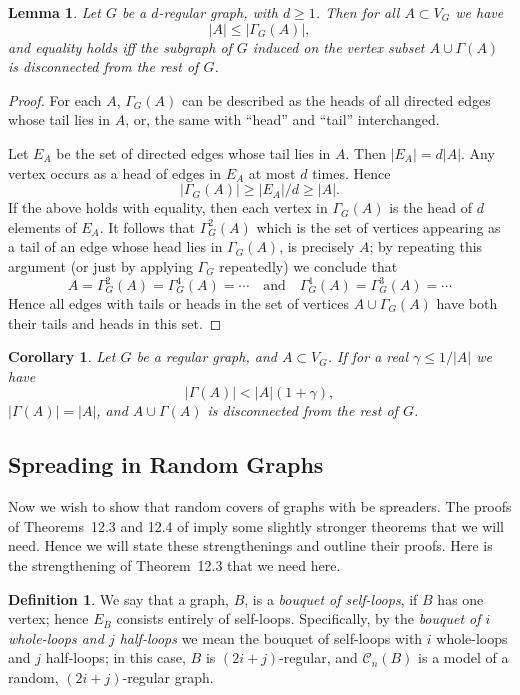 \documentclass{memo-l}
\theoremstyle{plain}
\newtheorem{lemma}[theorem]{Lemma}
\newtheorem{corollary}[theorem]{Corollary}
\theoremstyle{definition}
\newtheorem{definition}[theorem]{Definition}
\numberwithin{section}{chapter}
\numberwithin{equation}{chapter}
\theoremstyle{plain}
\theoremstyle{definition}
\newcommand\cC{\mathcal{C}}
\begin{document}
\begin{lemma}\label{le:disconnected}
Let $G$ be a $d$-regular graph, with $d\ge 1$.  
Then for all $A\subset V_G$ we have
$$
|A| \le |\Gamma_G(A)|,
$$
and equality holds iff the subgraph of $G$ induced on the
vertex subset $A\cup \Gamma(A)$ is disconnected from the rest of $G$.
\end{lemma}
\begin{proof}
For each $A$, $\Gamma_G(A)$ can be described as the heads of all directed
edges whose tail lies in $A$, or, the same with ``head'' and ``tail''
interchanged.

Let $E_A$ be the set of
directed edges whose tail lies in $A$.  Then $|E_A|=d|A|$.
Any vertex occurs as a head of edges in $E_A$ at most $d$ times.
Hence 
$$
|\Gamma_G(A)|\ge |E_A|/d \ge |A|.
$$
If the above holds with equality, then each vertex in $\Gamma_G(A)$
is the head of $d$ elements of $E_A$.  It follows that
$\Gamma^2_G(A)$ which is the set of vertices appearing as a tail
of an edge whose head lies in $\Gamma_G(A)$, is precisely $A$; by repeating
this argument (or just by applying $\Gamma_G$ repeatedly) we conclude
that
$$
A = \Gamma^2_G(A) = \Gamma^4_G(A) = \cdots
\quad\mbox{and}\quad
\Gamma^1_G(A) = \Gamma^3_G(A) = \cdots
$$
Hence all edges with tails or heads in the set of vertices
$A\cup\Gamma_G(A)$ have both their tails and heads in this set.
\end{proof}

\begin{corollary}\label{co:disconnected}
Let $G$ be a regular graph, and $A\subset V_G$.  If for 
a real $\gamma \le 1/|A|$ we have 
$$
|\Gamma(A)| < |A| (1+\gamma),
$$
$|\Gamma(A)|=|A|$, and
$A\cup \Gamma(A)$ is disconnected from the rest of $G$.
\end{corollary}



\subsection{Spreading in Random Graphs}

Now we wish to show that random covers of graphs with be spreaders.
The proofs of 
Theorems~12.3 and 12.4 of \cite{friedman_alon} imply some
slightly stronger theorems that we will need.  Hence we will
state these strengthenings and outline their proofs.
Here is the strengthening of Theorem~12.3 that we need here.

\begin{definition} 
We say that a graph, $B$, is a {\em bouquet of self-loops}, if $B$ has one
vertex; hence $E_B$ consists entirely of self-loops.
Specifically, by the {\em bouquet of $i$ whole-loops and $j$ half-loops}
we mean the bouquet of self-loops with $i$ whole-loops and $j$ half-loops;
in this case, $B$ is $(2i+j)$-regular, and $\cC_n(B)$ is a model
of a random, $(2i+j)$-regular graph.
\end{definition}
\end{document}
